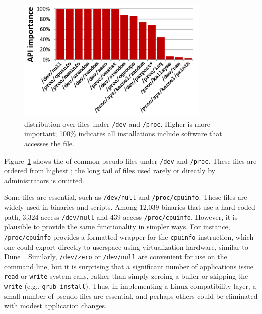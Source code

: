 \begin{figure}[t]
\centering
\includegraphics[width=3.6in]{syspop/figures/dev-proc-popularity-by-inst.pdf}
\caption[\Usagemetric{} of selected {\tt /dev} and {\tt /proc} pseudo-files]
{\usagemetric{} distribution over files under {\tt /dev} and {\tt /proc}.  Higher is more important; 100\% indicates all installations include software that accesses the file. }
\label{fig:dev-proc-popularity}
\end{figure}

Figure~\ref{fig:dev-proc-popularity} shows the \usagemetric{} of common pseudo-files under {\tt/dev} and {\tt /proc}.  
These files are ordered from highest \usagemetric{}; the long tail
of files used rarely or directly by administrators is omitted.

Some files %
are essential,
such as {\tt /dev/null} and {\tt /proc\-/\-cpuinfo}.
These files are widely used in %
binaries and scripts.
Among 12,039 binaries that use a hard-coded path,
3,324 access {\tt /dev/null} and 439 access {\tt /proc/cpuinfo}.
However, it is plausible to provide the same functionality in
simpler ways.
For instance, {\tt /proc/cpuinfo} provides a formatted wrapper for
the {\tt cpuinfo} instruction, which one could export
directly to userspace using virtualization hardware, similar to Dune~\citep{belay12dune}.
Similarly, {\tt /dev/zero} or {\tt /dev/null} are convenient for use on the command
line, but it is surprising that a significant number of applications
issue {\tt read} or {\tt write} system calls, rather than simply zeroing a buffer
or skipping the {\tt write}
(e.g., {\tt grub-install}).
Thus, in implementing a Linux compatibility layer, a small number of pseudo-files
are essential, and perhaps others could be eliminated with modest application changes.


